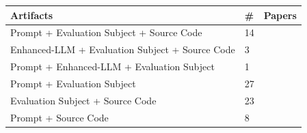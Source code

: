 \begin{tabular} { p{} p{} p{} } \\ 
\toprule 
Artifacts & \# & Papers\\ 
\midrule  
Prompt + Evaluation Subject + Source Code & 14 & \cite{ \papernineteenth,\paperthirtyfirst,\paperfiftysecond,\paperfiftyninth,\paperninetyfourth,\paperonehundredninth,\paperonehundrednineteenth,\paperonehundredfortysecond,\paperonehundredfortyfifth,\paperonehundredfortysixth,\paperonehundredseventyfourth,\paperonehundredeightyfourth,\papertwohundrednineteenth,\papertwohundredfiftysecond }\\ 
Enhanced-LLM + Evaluation Subject + Source Code & 3 & \cite{ \paperonehundredtwentythird,\paperonehundredsixtyfirst,\papersixtysixth }\\ 
Prompt + Enhanced-LLM + Evaluation Subject & 1 & \cite{ \papereightyseventh }\\ 
Prompt + Evaluation Subject & 27 & \cite{ \papersixteenth,\paperthirtysixth,\paperfortyfirst,\paperseventyseventh,\papereightysecond,\paperonehundredth,\paperonehundredsixth,\paperonehundredthirteenth,\paperonehundredfourteenth,\paperonehundredsixteenth,\paperonehundredtwentyeighth,\paperonehundredthirtysixth,\paperonehundredthirtyseventh,\paperonehundredthirtyninth,\paperonehundredfortyeighth,\paperonehundredsixtysixth,\paperonehundredsixtyeighth,\paperonehundredeightyfifth,\paperonehundredeightyeighth,\papertwohundredninth,\papertwohundredeleventh,\papertwohundredtwentyfifth,\papertwohundredtwentysixth,\papertwohundredfortysecond,\papertwohundredfortythird,\papertwohundredfortyeighth,\papertwohundredfiftieth }\\ 
Evaluation Subject + Source Code & 23 & \cite{ \paperthird,\paperthirtieth,\paperthirtyeighth,\paperfortysecond,\paperfortyfifth,\papersixtyseventh,\papersixtyninth,\paperseventieth,\paperonehundredfortieth,\paperonehundredfortyfirst,\paperonehundredfiftysecond,\paperonehundredfiftyeighth,\paperonehundredseventysecond,\paperonehundredseventyeighth,\paperonehundredninetieth,\paperonehundredninetysecond,\papertwohundredeighth,\papertwohundredtwelfth,\papertwohundredfifteenth,\papertwohundredthirtieth,\papertwohundredthirtysecond,\papertwohundredthirtyeighth,\papertwohundredfortyfourth }\\ 
Prompt + Source Code & 8 & \cite{ \papertwentieth,\paperthirtyninth,\paperfiftyfirst,\papersixtyfirst,\paperonehundredfortyninth,\paperonehundredfiftyfifth,\paperonehundredeightieth,\papertwohundredfortyseventh }\\ 

\end{tabular}
